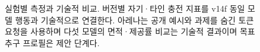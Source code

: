 \begin{figure}[!t]
\centering
\resizebox{\textwidth}{!}{}
\caption{실험별 측정과 기술적 비교. 버전별 자기·타인 충전 지표를 v14f 동일 모델 행동과 기술적으로 연결한다. 아레나는 공개 예시와 과제를 숨긴 토큰 요청을 사용하며 다섯 모델의 면적·제공률 비교는 기술적 결과이며 목표 추구 프로필은 제안 단계다.}
\label{fig:overview}
\end{figure}
